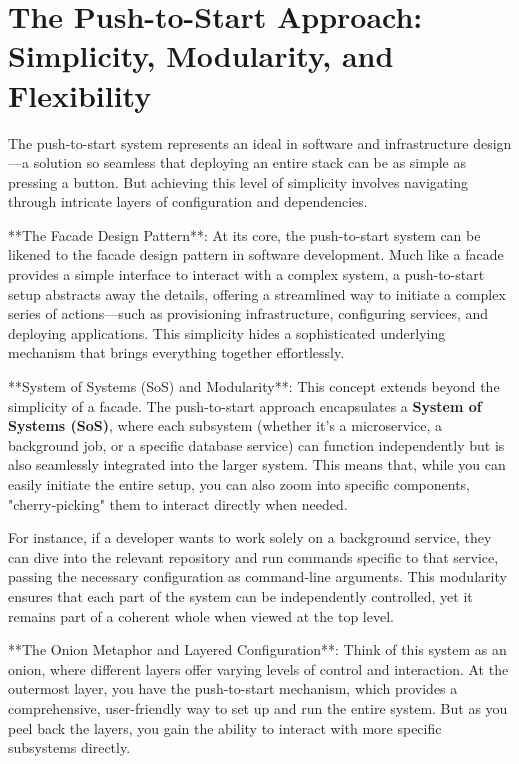 \documentclass[../../main.tex]{subfiles}
\begin{document}
    \section{The Push-to-Start Approach: Simplicity, Modularity, and Flexibility}

    The push-to-start system represents an ideal in software and infrastructure design—a solution so seamless that deploying an entire stack can be as simple as pressing a button. But achieving this level of simplicity involves navigating through intricate layers of configuration and dependencies.

    **The Facade Design Pattern**: At its core, the push-to-start system can be likened to the facade design pattern in software development. Much like a facade provides a simple interface to interact with a complex system, a push-to-start setup abstracts away the details, offering a streamlined way to initiate a complex series of actions—such as provisioning infrastructure, configuring services, and deploying applications. This simplicity hides a sophisticated underlying mechanism that brings everything together effortlessly.

    **System of Systems (SoS) and Modularity**: This concept extends beyond the simplicity of a facade. The push-to-start approach encapsulates a \textbf{System of Systems (SoS)}, where each subsystem (whether it's a microservice, a background job, or a specific database service) can function independently but is also seamlessly integrated into the larger system. This means that, while you can easily initiate the entire setup, you can also zoom into specific components, "cherry-picking" them to interact directly when needed.

    For instance, if a developer wants to work solely on a background service, they can dive into the relevant repository and run commands specific to that service, passing the necessary configuration as command-line arguments. This modularity ensures that each part of the system can be independently controlled, yet it remains part of a coherent whole when viewed at the top level.

    **The Onion Metaphor and Layered Configuration**: Think of this system as an onion, where different layers offer varying levels of control and interaction. At the outermost layer, you have the push-to-start mechanism, which provides a comprehensive, user-friendly way to set up and run the entire system. But as you peel back the layers, you gain the ability to interact with more specific subsystems directly.
\end{document}
